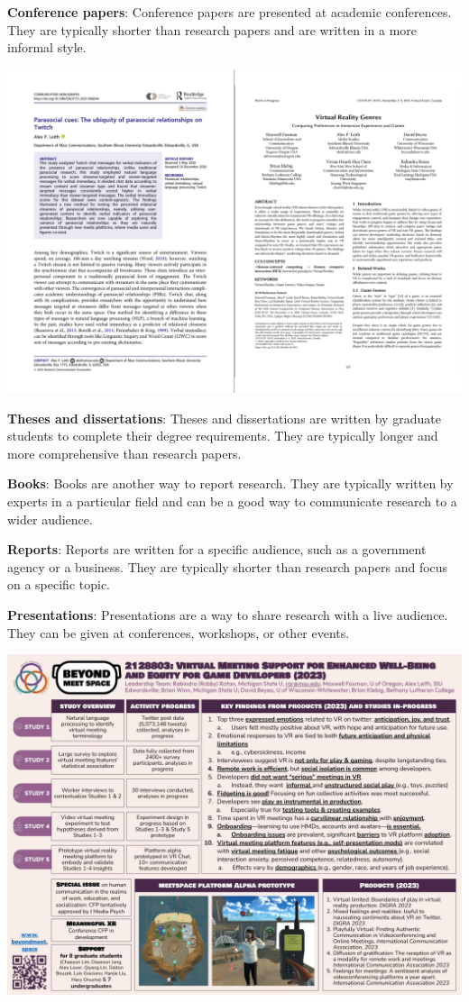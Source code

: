\documentclass[
]{book}
\begin{document}
\textbf{Conference papers}: Conference papers are presented at academic conferences. They are typically shorter than research papers and are written in a more informal style.

\includegraphics[width=1\textwidth,height=\textheight]{images/papers.png}

\textbf{Theses and dissertations}: Theses and dissertations are written by graduate students to complete their degree requirements. They are typically longer and more comprehensive than research papers.

\textbf{Books}: Books are another way to report research. They are typically written by experts in a particular field and can be a good way to communicate research to a wider audience.

\textbf{Reports}: Reports are written for a specific audience, such as a government agency or a business. They are typically shorter than research papers and focus on a specific topic.

\textbf{Presentations}: Presentations are a way to share research with a live audience. They can be given at conferences, workshops, or other events.

\includegraphics[width=1\textwidth,height=\textheight]{images/BMS 2023 poster final.jpg}
\end{document}
